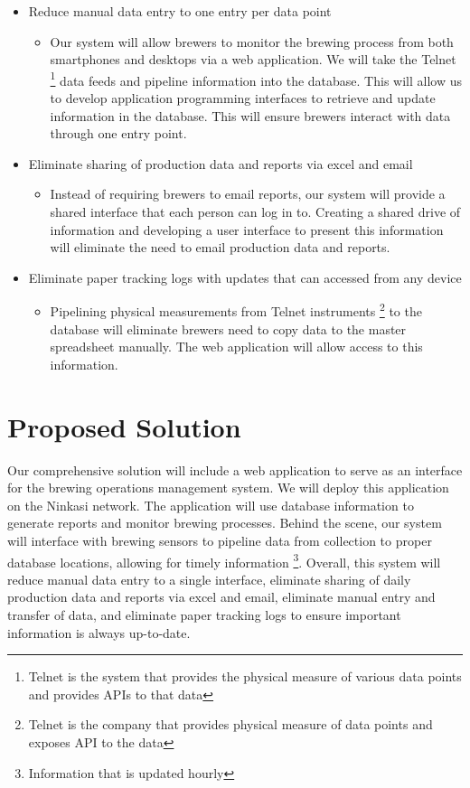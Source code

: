 \documentclass[draftclsnofoot,onecolumn,letterpaper,10pt]{IEEEtran}
\begin{document}
\begin{itemize}

	\item {Reduce manual data entry to one entry per data point}
		\begin{itemize}
			\item {Our system will allow brewers to monitor the brewing process from both smartphones and desktops via a web application. We will take the Telnet \footnote{Telnet is the system that provides the physical measure of various data points and provides APIs to that data} data feeds and pipeline information into the database. This will allow us to develop application programming interfaces to retrieve and update information in the database. This will ensure brewers interact with data through one entry point.}
		\end{itemize}


	\item {Eliminate sharing of production data and reports via excel and email}
	    \begin{itemize}
			\item {Instead of requiring brewers to email reports, our system will provide a shared interface that each person can log in to. Creating a shared drive of information and developing a user interface to present this information will eliminate the need to email production data and reports.}
			\end{itemize}


	\item {Eliminate paper tracking logs with updates that can accessed from any device}
	    \begin{itemize}
			\item {Pipelining physical measurements from Telnet instruments \footnote{Telnet is the company that provides physical measure of data points and exposes API to the data} to the database will eliminate brewers need to copy data to the master spreadsheet manually. The web application will allow access to this information.}
		\end{itemize}
\end{itemize}

\section{\textbf{Proposed Solution}}
Our comprehensive solution will include a web application to serve as an interface for the brewing operations management system. We will deploy this application on the Ninkasi network. The application will use database information to generate reports and monitor brewing processes. Behind the scene, our system will interface with brewing sensors to pipeline data from collection to proper database locations, allowing for timely information \footnote{Information that is updated hourly}. Overall, this system will reduce manual data entry to a single interface, eliminate sharing of daily production data and reports via excel and email, eliminate manual entry and transfer of data, and eliminate paper tracking logs to ensure important information is always up-to-date.
\end{document}
